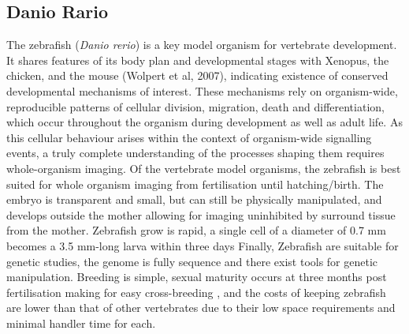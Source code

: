 \subsection{Danio Rario}
The zebrafish (\emph{Danio rerio}) is a key model organism for vertebrate development.
It shares features of its body plan and developmental stages with Xenopus, the chicken, and the mouse (Wolpert et al, 2007), indicating existence of conserved developmental mechanisms of interest.
These mechanisms rely on organism-wide, reproducible patterns of cellular division, migration, death and differentiation, which occur throughout the organism during development as well as adult life.
As this cellular behaviour arises within the context of organism-wide signalling events, a truly complete understanding of the processes shaping them requires whole-organism imaging.
Of the vertebrate model organisms, the zebrafish is best suited for whole organism imaging from fertilisation until hatching/birth.
The embryo is transparent and small, but can still be physically manipulated, and develops outside the mother allowing for imaging uninhibited by surround tissue from the mother.
Zebrafish grow is rapid, a single cell of a diameter of 0.7 mm becomes a 3.5 mm-long larva within three days %
Finally, Zebrafish are suitable for genetic studies, the genome is fully sequence and there exist tools for genetic manipulation.
Breeding is simple, sexual maturity occurs at three months post fertilisation making for easy cross-breeding %
, and the costs of keeping zebrafish are lower than that of other vertebrates due to their low space requirements and minimal handler time for each. %


